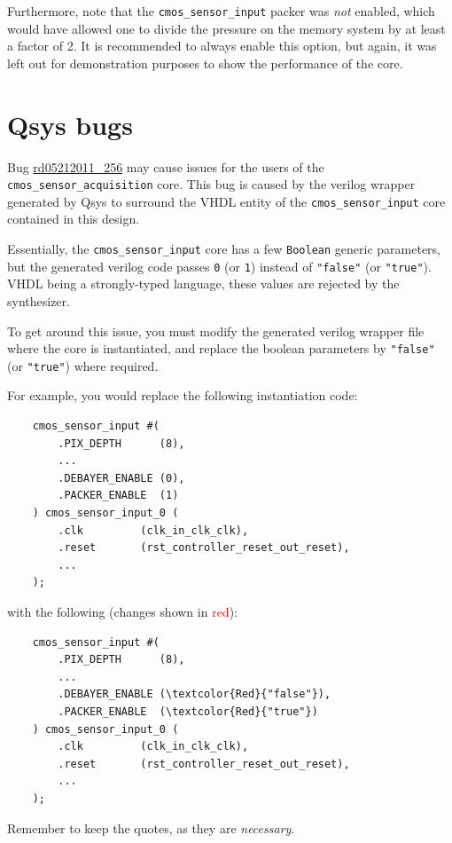 \documentclass{article}
\def \cmossensoracquisition {\texttt{cmos\_sensor\_acquisition} }
\def \cmossensorinput {\texttt{cmos\_sensor\_input} }
\begin{document}
Furthermore, note that the \cmossensorinput packer was \emph{not} enabled, which would have allowed one to divide the pressure on the memory system by at least a factor of 2. It is recommended to always enable this option, but again, it was left out for demonstration purposes to show the performance of the core.

\newpage

\section{Qsys bugs}
Bug \href{https://www.altera.com/support/support-resources/knowledge-base/solutions/rd05212011_256.html}{rd05212011\_256} may cause issues for the users of the \cmossensoracquisition core.
This bug is caused by the verilog wrapper generated by Qsys to surround the VHDL entity of the \cmossensorinput core contained in this design.

Essentially, the \cmossensorinput core has a few \texttt{Boolean} generic parameters, but the generated verilog code passes \texttt{0} (or \texttt{1}) instead of \texttt{"false"} (or \texttt{"true"}). VHDL being a strongly-typed language, these values are rejected by the synthesizer.

To get around this issue, you must modify the generated verilog wrapper file where the core is instantiated, and replace the boolean parameters by \texttt{"false"} (or \texttt{"true"}) where required.

For example, you would replace the following instantiation code:
\begin{Verbatim}
    cmos_sensor_input #(
        .PIX_DEPTH      (8),
        ...
        .DEBAYER_ENABLE (0),
        .PACKER_ENABLE  (1)
    ) cmos_sensor_input_0 (
        .clk         (clk_in_clk_clk),
        .reset       (rst_controller_reset_out_reset),
        ...
    );
\end{Verbatim}

with the following (changes shown in \textcolor{red}{red}):
\begin{Verbatim}
    cmos_sensor_input #(
        .PIX_DEPTH      (8),
        ...
        .DEBAYER_ENABLE (\textcolor{Red}{"false"}),
        .PACKER_ENABLE  (\textcolor{Red}{"true"})
    ) cmos_sensor_input_0 (
        .clk         (clk_in_clk_clk),
        .reset       (rst_controller_reset_out_reset),
        ...
    );
\end{Verbatim}

Remember to keep the quotes, as they are \emph{necessary}.
\end{document}
